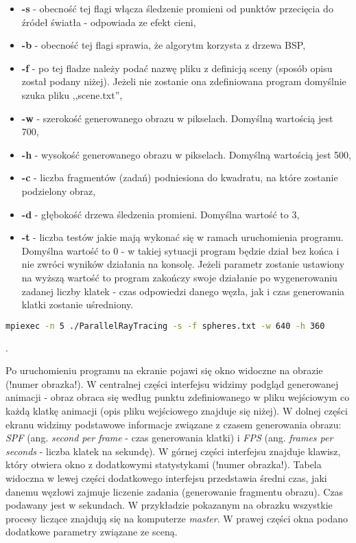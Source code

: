 \begin{itemize}

\item \textbf{-s} - obecność tej flagi włącza śledzenie promieni od punktów przecięcia do źródeł światła - odpowiada ze efekt cieni,
\item \textbf{-b} - obecność tej flagi sprawia, że algorytm korzysta z drzewa BSP,
\item \textbf{-f} - po tej fladze należy podać nazwę pliku z definicją sceny (sposób opisu został podany niżej). Jeżeli nie zostanie ona zdefiniowana program domyślnie szuka pliku ,,scene.txt'',
\item \textbf{-w} - szerokość generowanego obrazu w pikselach. Domyślną wartością jest 700,
\item \textbf{-h} - wysokość generowanego obrazu w pikselach. Domyślną wartością jest 500,
\item \textbf{-c} - liczba fragmentów (zadań) podniesiona do kwadratu, na które zostanie podzielony obraz,
\item \textbf{-d} - głębokość drzewa śledzenia promieni. Domyślna wartość to 3,
\item \textbf{-t} - liczba testów jakie mają wykonać się w ramach uruchomienia programu. Domyślna wartość to 0 - w takiej sytuacji program będzie dział bez końca i nie zwróci wyników działania na konsolę. Jeżeli parametr zostanie ustawiony na wyższą wartość to program zakończy swoje działanie po wygenerowaniu zadanej liczby klatek - czas odpowiedzi danego węzła, jak i czas generowania klatki zostanie uśredniony.

\end{itemize}

\begin{lstlisting}[language=bash]
mpiexec -n 5 ./ParallelRayTracing -s -f spheres.txt -w 640 -h 360
\end{lstlisting}.

Po uruchomieniu programu na ekranie pojawi się okno widoczne na obrazie (!numer obrazka!). W centralnej części interfejsu widzimy podgląd generowanej animacji - obraz obraca się według punktu zdefiniowanego w pliku wejściowym co każdą klatkę animacji (opis pliku wejściowego znajduje się niżej). W dolnej części ekranu widzimy podstawowe informacje związane z czasem generowania obrazu: \emph{SPF} (ang. \emph{second per frame} - czas generowania klatki) i \emph{FPS} (ang. \emph{frames per seconds} - liczba klatek na sekundę). W górnej części interfejsu znajduje klawisz, który otwiera okno z dodatkowymi statystykami (!numer obrazka!). Tabela widoczna w lewej części dodatkowego interfejsu przedstawia średni czas, jaki danemu węzłowi zajmuje liczenie zadania (generowanie fragmentu obrazu). Czas podawany jest w sekundach. W przykładzie pokazanym na obrazku wszystkie procesy liczące znajdują się na komputerze \emph{master}. W prawej części okna podano dodatkowe parametry związane ze sceną.

